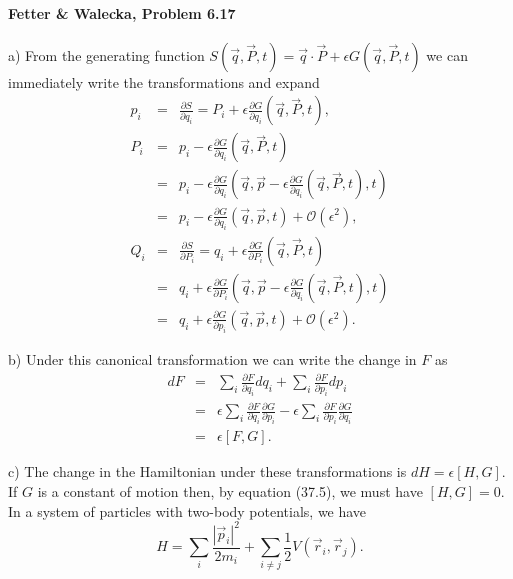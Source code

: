 \documentclass[letterpaper,11pt]{article}
\begin{document}
\paragraph*{Fetter \& Walecka, Problem 6.17}
a) From the generating function $S(\vec{q},\vec{P},t) = \vec{q} \cdot \vec{P} + \epsilon G(\vec{q},\vec{P},t)$ we can immediately write the transformations and expand
\begin{eqnarray*}
 p_i & = & \frac{\partial S}{\partial q_i} = P_i + \epsilon \frac{\partial G}{\partial q_i}(\vec{q},\vec{P},t), \\
 P_i & = & p_i - \epsilon \frac{\partial G}{\partial q_i}(\vec{q},\vec{P},t) \\
     & = & p_i - \epsilon \frac{\partial G}{\partial q_i}(\vec{q},\vec{p} - \epsilon \frac{\partial G}{\partial q_i}(\vec{q},\vec{P},t),t) \\
     & = & p_i - \epsilon \frac{\partial G}{\partial q_i}(\vec{q},\vec{p},t) + \mathcal{O}(\epsilon^2), \\
 Q_i & = & \frac{\partial S}{\partial P_i} = q_i + \epsilon \frac{\partial G}{\partial P_i}(\vec{q},\vec{P},t) \\
     & = & q_i + \epsilon \frac{\partial G}{\partial P_i}(\vec{q},\vec{p} - \epsilon \frac{\partial G}{\partial q_i}(\vec{q},\vec{P},t),t) \\
     & = & q_i + \epsilon \frac{\partial G}{\partial p_i}(\vec{q},\vec{p},t) + \mathcal{O}(\epsilon^2).
\end{eqnarray*}

b) Under this canonical transformation we can write the change in $F$ as
\begin{eqnarray*}
 dF & = & \sum_i \frac{\partial F}{\partial q_i} dq_i + \sum_i \frac{\partial F}{\partial p_i} dp_i \\
    & = & \epsilon \sum_i \frac{\partial F}{\partial q_i} \frac{\partial G}{\partial p_i} - \epsilon \sum_i \frac{\partial F}{\partial p_i} \frac{\partial G}{\partial q_i} \\
    & = & \epsilon [F,G].
\end{eqnarray*}

c) The change in the Hamiltonian under these transformations is $dH = \epsilon [H,G]$.  If $G$ is a constant of motion then, by equation (37.5), we must have $[H,G] = 0$.  In a system of particles with two-body potentials, we have
\begin{equation*}
 H = \sum_i \frac{|\vec{p}_i|^2}{2 m_i} + \sum_{i \neq j} \frac{1}{2} V(\vec{r}_i,\vec{r}_j).
\end{equation*}
\end{document}
